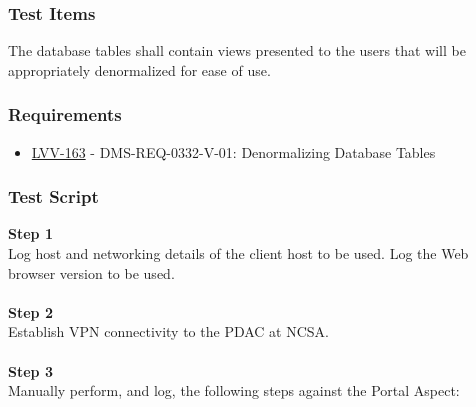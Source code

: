 \hypertarget{test-items-2}{%
\subsubsection{Test Items}\label{test-items-2}}

The database tables shall contain views presented to the users that will
be appropriately denormalized for ease of use.

\hypertarget{requirements-2}{%
\subsubsection{Requirements}\label{requirements-2}}

\begin{itemize}
\tightlist
\item
  \href{https://jira.lsstcorp.org/browse/LVV-163}{LVV-163} -
  DMS-REQ-0332-V-01: Denormalizing Database Tables
\end{itemize}

\hypertarget{test-script-2}{%
\subsubsection{Test Script}\label{test-script-2}}

\textbf{Step 1}\\
Log host and networking details of the client host to be used. Log the
Web browser version to be used.\\
~\\
\textbf{Step 2}\\
Establish VPN connectivity to the PDAC at NCSA.\\
~\\
\textbf{Step 3}\\
Manually perform, and log, the following steps against the Portal
Aspect:

